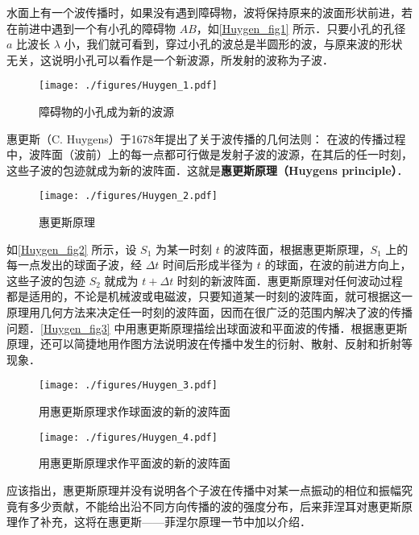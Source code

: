 
水面上有一个波传播时，如果没有遇到障碍物，波将保持原来的波面形状前进，若在前进中遇到一个有小孔的障碍物 $AB$，如\autoref{Huygen_fig1} 所示．只要小孔的孔径 $a $ 比波长 $\lambda$ 小，我们就可看到，穿过小孔的波总是半圆形的波，与原来波的形状无关，这说明小孔可以看作是一个新波源，所发射的波称为子波．

\begin{figure}[ht]
\centering
\texttt{[image: ./figures/Huygen\_1.pdf]}
\caption{障碍物的小孔成为新的波源} \label{Huygen_fig1}
\end{figure}

惠更斯（C. Huygens）于1678年提出了关于波传播的几何法则： 在波的传播过程中，波阵面（波前）上的每一点都可行做是发射子波的波源，在其后的任一时刻，这些子波的包迹就成为新的波阵面．这就是\textbf{惠更斯原理（Huygens principle）}．
\begin{figure}[ht]
\centering
\texttt{[image: ./figures/Huygen\_2.pdf]}
\caption{惠更斯原理} \label{Huygen_fig2}
\end{figure}

如\autoref{Huygen_fig2} 所示，设 $S_1$ 为某一时刻 $t $ 的波阵面，根据惠更斯原理，$S_1$ 上的每一点发出的球面子波，经 $\Delta t$ 时间后形成半径为 $t$ 的球面，在波的前进方向上，这些子波的包迹 $S_2$ 就成为 $t+\Delta t$ 时刻的新波阵面．惠更斯原理对任何波动过程都是适用的，不论是机械波或电磁波，只要知道某一时刻的波阵面，就可根据这一原理用几何方法来决定任一时刻的波阵面，因而在很广泛的范围内解决了波的传播问题．\autoref{Huygen_fig3} 中用惠更斯原理描绘出球面波和平面波的传播．根据惠更斯原理，还可以简捷地用作图方法说明波在传播中发生的衍射、散射、反射和折射等现象．
\begin{figure}[ht]
\centering
\texttt{[image: ./figures/Huygen\_3.pdf]}
\caption{用惠更斯原理求作球面波的新的波阵面} \label{Huygen_fig3}
\end{figure}
\begin{figure}[ht]
\centering
\texttt{[image: ./figures/Huygen\_4.pdf]}
\caption{用惠更斯原理求作平面波的新的波阵面} \label{Huygen_fig4}
\end{figure}
应该指出，惠更斯原理并没有说明各个子波在传播中对某一点振动的相位和振幅究竟有多少贡献，不能给出沿不同方向传播的波的强度分布，后来菲涅耳对惠更斯原理作了补充，这将在惠更斯——菲涅尔原理一节中加以介绍．
